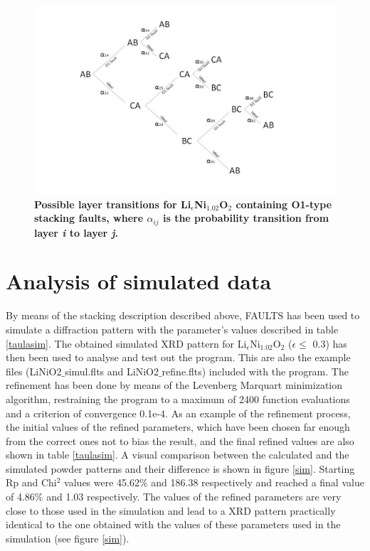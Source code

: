\begin{figure}[h!]
\begin{center}
\includegraphics [width=5.2 in]{transitions.jpg}
\caption{\bf Possible layer transitions for Li$_{\epsilon}$Ni$_{1.02}$O$_{2}$ containing O1-type stacking faults, where $\alpha_{ij}$ is the probability transition from layer \emph{i} to layer \emph{j}.}
\label{capes}
\end{center}
\end{figure}





\section{Analysis of simulated data}
\label{Analysis of simulated data}

By  means of the  stacking description described above, FAULTS has been used to simulate a diffraction pattern with the parameter's values described in table \ref{taulasim}.
The obtained simulated XRD pattern for Li$_{\epsilon}$Ni$_{1.02}$O$_{2}$ ($\epsilon\leq$ 0.3) has then been used to analyse and test out the program. This are also the example files (LiNiO2$\_$simul.flts and LiNiO2$\_$refine.flts) included with the program. The refinement has been done by means of the Levenberg Marquart minimization algorithm, restraining the program to a maximum of 2400 function evaluations and a criterion of convergence 0.1e-4. As an example of the refinement process, the initial values of the refined parameters, which have been chosen far enough from the correct ones not to bias the result,
and  the final refined values are also  shown in table \ref{taulasim}.
A visual comparison between the calculated and the simulated powder patterns and their difference is shown in figure \ref{sim}.
Starting Rp and Chi$^{2}$ values were 45.62$\%$  and 186.38 respectively and reached a final value of 4.86$\%$ and 1.03 respectively.
The values of the refined parameters are very close to those used in the simulation and lead to a XRD pattern practically
identical to the one obtained with the values of these parameters used in the simulation (see figure \ref{sim}).



